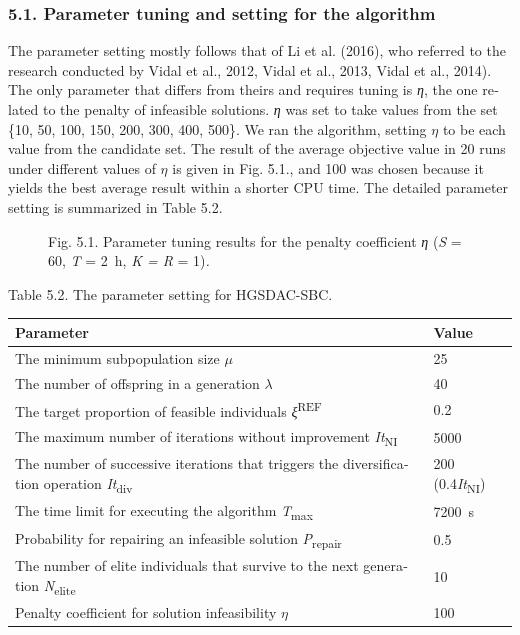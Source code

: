 \documentclass[
  english,
]{article}
\newcounter{none} %
\begin{document}
\begin{otherlanguage}{english}
\protect{}\label{s0110}
\subsubsection{5.1. Parameter tuning and setting for the algorithm}\label{st130}

\protect{}\label{p0635}
The parameter setting mostly follows that of Li et al. (2016), who referred to the research
conducted by Vidal et al., 2012, Vidal et al., 2013, Vidal et al., 2014). The only parameter that
differs from theirs and requires tuning is \emph{η}, the one related to the penalty of infeasible
solutions. \emph{η} was set to take values from the set \{10, 50, 100, 150, 200, 300, 400, 500\}. We
ran the algorithm, setting \(\eta\) to be each value from the candidate set. The result of the
average objective value in 20 runs under different values of \(\eta\) is given in Fig. 5.1., and 100
was chosen because it yields the best average result within a shorter CPU time. The detailed
parameter setting is summarized in Table 5.2.

\begin{figure}
\centering
Fig. 5.1. Parameter tuning results for the penalty coefficient \emph{η}
(\textbar{}\emph{S}\textbar{} = 60, \emph{T} = 2~h, \emph{\textbar K\textbar{} =
\textbar R}\textbar{} = 1)\emph{.}
\caption{}\label{f0035}
\end{figure}

\protect{}\label{t0015}
Table 5.2. The parameter setting for HGSDAC-SBC.

{\def\LTcaptype{none} %
\begin{longtable}[]{@{}ll@{}}
\toprule\noalign{}
Parameter & Value \\
\midrule\noalign{}
\endhead
\bottomrule\noalign{}
\endlastfoot
The minimum subpopulation size \(\mu\) & 25 \\
The number of offspring in a generation \(\lambda\) & 40 \\
The target proportion of feasible individuals \emph{ξ}\textsuperscript{REF} & 0.2 \\
The maximum number of iterations without improvement \emph{It}\textsubscript{NI} & 5000 \\
The number of successive iterations that triggers the diversification operation
\emph{It}\textsubscript{div} & 200 (0.4\emph{It}\textsubscript{NI}) \\
The time limit for executing the algorithm \emph{T}\textsubscript{max} & 7200~s \\
Probability for repairing an infeasible solution \emph{P}\textsubscript{repair} & 0.5 \\
The number of elite individuals that survive to the next generation \emph{N}\textsubscript{elite} &
10 \\
Penalty coefficient for solution infeasibility \(\eta\) & 100 \\
\end{longtable}
}


\end{otherlanguage}
\end{document}
